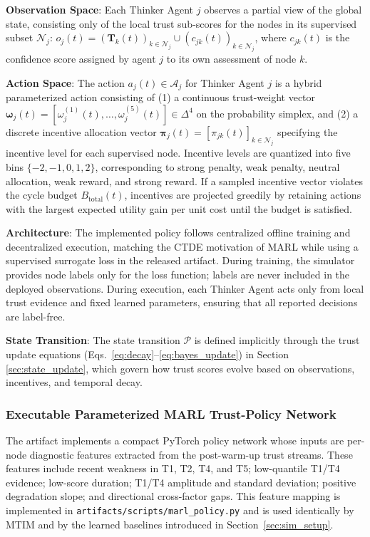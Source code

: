 \documentclass[notspecified,article,submit,moreauthors]{Definitions/mdpi}
\begin{document}
\textbf{Observation Space}: Each Thinker Agent $j$ observes a partial view of the global state, consisting only of the local trust sub-scores for the nodes in its supervised subset $\mathcal{N}_j$: $o_j(t) = (\mathbf{T}_k(t))_{k \in \mathcal{N}_j} \cup (c_{jk}(t))_{k \in \mathcal{N}_j}$, where $c_{jk}(t)$ is the confidence score assigned by agent $j$ to its own assessment of node $k$.

\textbf{Action Space}: The action $a_j(t) \in \mathcal{A}_j$ for Thinker Agent $j$ is a hybrid parameterized action consisting of (1) a continuous trust-weight vector $\boldsymbol{\omega}_j(t) = [\omega_{j}^{(1)}(t), \dots, \omega_{j}^{(5)}(t)] \in \Delta^4$ on the probability simplex, and (2) a discrete incentive allocation vector $\boldsymbol{\pi}_j(t) = [\pi_{jk}(t)]_{k \in \mathcal{N}_j}$ specifying the incentive level for each supervised node. Incentive levels are quantized into five bins $\{-2, -1, 0, 1, 2\}$, corresponding to strong penalty, weak penalty, neutral allocation, weak reward, and strong reward. If a sampled incentive vector violates the cycle budget $B_{\text{total}}(t)$, incentives are projected greedily by retaining actions with the largest expected utility gain per unit cost until the budget is satisfied.

\textbf{Architecture}: The implemented policy follows centralized offline training and decentralized execution, matching the CTDE motivation of MARL while using a supervised surrogate loss in the released artifact. During training, the simulator provides node labels only for the loss function; labels are never included in the deployed observations. During execution, each Thinker Agent acts only from local trust evidence and fixed learned parameters, ensuring that all reported decisions are label-free.

\textbf{State Transition}: The state transition $\mathcal{P}$ is defined implicitly through the trust update equations (Eqs.~\ref{eq:decay}--\ref{eq:bayes_update}) in Section \ref{sec:state_update}, which govern how trust scores evolve based on observations, incentives, and temporal decay.

\subsubsection{Executable Parameterized MARL Trust-Policy Network}
The artifact implements a compact PyTorch policy network whose inputs are per-node diagnostic features extracted from the post-warm-up trust streams. These features include recent weakness in T1, T2, T4, and T5; low-quantile T1/T4 evidence; low-score duration; T1/T4 amplitude and standard deviation; positive degradation slope; and directional cross-factor gaps. This feature mapping is implemented in \texttt{artifacts/scripts/marl\_policy.py} and is used identically by MTIM and by the learned baselines introduced in Section~\ref{sec:sim_setup}.
\end{document}
